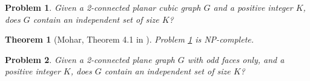 \documentclass{article}
\newtheorem{theorem}{Theorem}
\newtheorem{problem}{Problem}
\begin{document}
\begin{problem}\label{prob:2connplcubic}
Given a 2-connected planar cubic graph $G$ and a positive integer $K$, does $G$
contain an independent set of size $K$?
\end{problem}

\begin{theorem}[Mohar, Theorem 4.1 in \cite{mohar2001face}]\label{thm:2connplcubic}
Problem \ref{prob:2connplcubic} is NP-complete.
\end{theorem}


\begin{problem}\label{prob:2connplodd}
Given a 2-connected plane graph $G$ with odd faces only, and a positive integer $K$, does $G$
contain an independent set of size $K$?
\end{problem}
\end{document}
